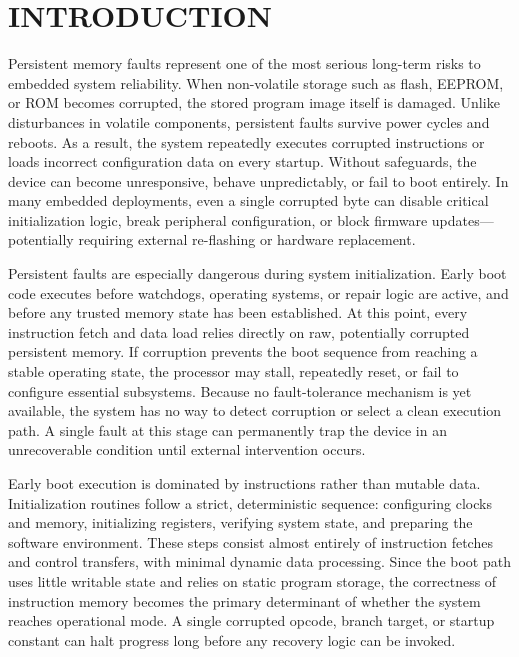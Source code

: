 \chapter{INTRODUCTION}
\label{chap-one}

Persistent memory faults represent one of the most serious long-term risks to embedded system reliability. When non-volatile storage such as flash, EEPROM, or ROM becomes corrupted, the stored program image itself is damaged. Unlike disturbances in volatile components, persistent faults survive power cycles and reboots. As a result, the system repeatedly executes corrupted instructions or loads incorrect configuration data on every startup. Without safeguards, the device can become unresponsive, behave unpredictably, or fail to boot entirely. In many embedded deployments, even a single corrupted byte can disable critical initialization logic, break peripheral configuration, or block firmware updates---potentially requiring external re-flashing or hardware replacement.

Persistent faults are especially dangerous during system initialization. Early boot code executes before watchdogs, operating systems, or repair logic are active, and before any trusted memory state has been established. At this point, every instruction fetch and data load relies directly on raw, potentially corrupted persistent memory. If corruption prevents the boot sequence from reaching a stable operating state, the processor may stall, repeatedly reset, or fail to configure essential subsystems. Because no fault-tolerance mechanism is yet available, the system has no way to detect corruption or select a clean execution path. A single fault at this stage can permanently trap the device in an unrecoverable condition until external intervention occurs.

Early boot execution is dominated by instructions rather than mutable data. Initialization routines follow a strict, deterministic sequence: configuring clocks and memory, initializing registers, verifying system state, and preparing the software environment. These steps consist almost entirely of instruction fetches and control transfers, with minimal dynamic data processing. Since the boot path uses little writable state and relies on static program storage, the correctness of instruction memory becomes the primary determinant of whether the system reaches operational mode. A single corrupted opcode, branch target, or startup constant can halt progress long before any recovery logic can be invoked.

